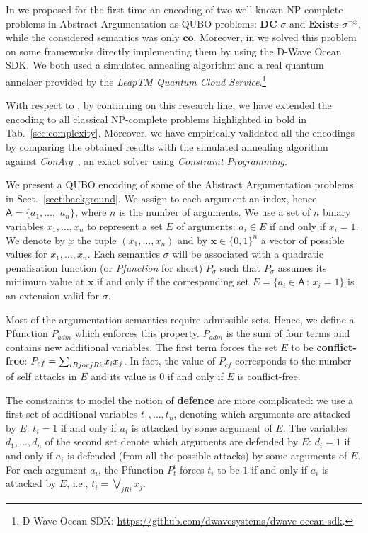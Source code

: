 \documentclass[conference,compsocconf]{IEEEtran}
\newcommand{\args}{\ensuremath{\mathsf{A}}\xspace} %
\newcommand{\atts}{\ensuremath{R}\xspace}
\newcommand{\co}{\mathbf{co}}
\newcommand{\dc}{\mathbf{DC}}
\begin{document}
In \cite{pricai22} we proposed for the first time an encoding of two well-known NP-complete problems in Abstract Argumentation as QUBO problems:   
$\dc\textit{-}\sigma$ and
$\mathit{\textbf{Exists}}\textit{-}\sigma^{\neg\varnothing}$, 
while the considered semantics was only $\co$.  
Moreover, in \cite{pricai22} we solved this problem on some frameworks directly  implementing them by using the D-Wave Ocean SDK. We both used a simulated annealing algorithm and a real quantum annelaer provided by the \emph{LeapTM Quantum Cloud Service}.\footnote{D-Wave Ocean SDK: \url{https://github.com/dwavesystems/dwave-ocean-sdk}.}

With respect to \cite{pricai22}, by continuing on this research line, we have extended the encoding to all classical NP-complete problems highlighted in bold in Tab.~\ref{sec:complexity}.
Moreover, we have empirically validated all the encodings by comparing the obtained results with the simulated annealing algorithm against \emph{ConArg}~\cite{conarg}, an exact solver using \emph{Constraint Programming}.



We  present a QUBO encoding of some of the Abstract Argumentation problems  in Sect.~\ref{sect:background}. 
We assign to each argument an index, hence $\args=\{a_1,\dots,$ $a_n\}$, where $n$ is the number of arguments. We use
a set of $n$ binary variables $x_1,\dots,x_n$ to represent a set $E$ of arguments: 
$a_i\in E$ if and only if $x_i=1$. We denote by $\underbar{x}$ the tuple $(x_1,\dots,x_n)$
and by $\mathbf{x}\in\{0,1\}^n$ a vector of possible values for $x_1,\dots,x_n$.
Each semantics $\sigma$ will be associated with a quadratic penalisation function (or \emph{Pfunction} for short) $P_{\sigma}$ such that $P_{\sigma}$ assumes its minimum value at $\mathbf{x}$ if and only if the corresponding set $E=\{a_i\in \args \,:\, x_i=1\}$ is an extension valid for $\sigma$. 

Most of the argumentation semantics require admissible sets. Hence, we define a Pfunction $P_{adm}$ which enforces this property. $P_{adm}$ is the sum of four terms and contains new additional variables.
The first term forces the set $E$ to be \textbf{conflict-free}:
$ P_{cf}=\sum_{i \atts j \mbox{ or }\\
	j \atts i} x_i x_j $. In fact, the value of $ P_{cf}$ corresponds to the number of self attacks in $E$
and its value is $0$ if and only if $E$ is conflict-free. 

The constraints to model the notion of \textbf{defence} are more complicated: we use a first set of additional variables $t_1,\dots,t_n$, denoting which arguments are attacked by $E$: $t_i=1$ if and only if $a_i$ is attacked by some argument of $E$. 
The variables $d_1,\dots,d_n$ of the second set denote which arguments are defended by $E$: $d_i=1$ if and only if $a_i$ is defended (from all the possible attacks) by some arguments of $E$. For each argument $a_i$, the Pfunction $P_{t}^i$ forces $t_i$ to be $1$ if and only if $a_i$ is attacked by $E$, i.e.,
$t_i = \bigvee_{j \atts i} x_j$.
\end{document}
